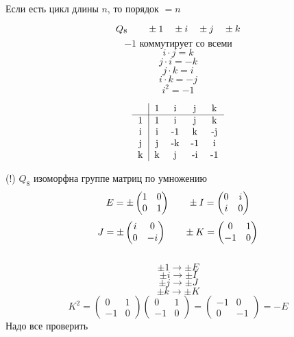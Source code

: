 \documentclass[12pt, fleqn]{article}
\begin{document}
\begin{utv}
    Если есть цикл длины $n$, то порядок $= n$
\end{utv}

\begin{Reminder}
    \[Q_8 \qquad \pm 1 \quad \pm i \quad \pm j \quad \pm k\]
    \[-1 \text{ коммутирует со всеми}\]
    \[i \cdot j = k\]
    \[j \cdot i = -k\]
    \[j \cdot k = i\]
    \[i \cdot k = -j\]
    \[i^2 = -1\]

    \[\begin{tabular} {c|c c c c}
        &  1 & i & j & k\\ \hline
        1   &  1  & i & j & k\\
        i & i & -1 & k & -j\\
        j & j & -k & -1 & i\\
        k & k & j & -i & -1
    \end{tabular}\]
\end{Reminder}

\begin{task}[4]
    (!) \q $Q_8$ изоморфна группе матриц по умножению
    \[E = \pm \begin{pmatrix}
        1 & 0\\
        0 & 1
    \end{pmatrix} \qquad \pm I = \begin{pmatrix}
        0 & i\\
        i  &0
    \end{pmatrix}\]
    \[J = \pm\begin{pmatrix}
        i & 0\\
        0 & -i
    \end{pmatrix} \qquad \pm K = \begin{pmatrix}
        0 & 1\\
        -1 & 0
    \end{pmatrix}\]
    \\
    \[\pm 1 \to \pm E\]
    \[\pm i \to \pm I\]
    \[\pm j \to \pm J\]
    \[\pm k \to \pm K\]
    \[K^2 = \begin{pmatrix}
        0 & 1\\
        -1 & 0
    \end{pmatrix} \begin{pmatrix}
        0 & 1\\
        -1 & 0
    \end{pmatrix} = \begin{pmatrix}
        -1 & 0\\
         0 & -1
    \end{pmatrix} = -E\]
    Надо все проверить\\ 
\end{task}
\end{document}
